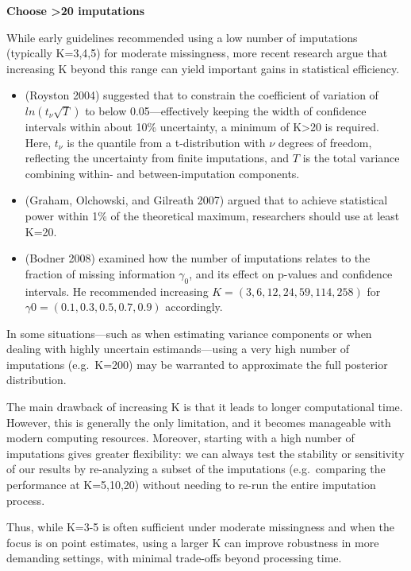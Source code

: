 \documentclass{article}
\providecommand{\tightlist}{%
  \setlength{\itemsep}{0pt}\setlength{\parskip}{0pt}}
\begin{document}
\textbf{Choose \textgreater20 imputations}

While early guidelines recommended using a low number of imputations
(typically K=3,4,5) for moderate missingness, more recent research argue
that increasing K beyond this range can yield important gains in
statistical efficiency.

\begin{itemize}
\tightlist
\item
  (Royston 2004) suggested that to constrain the coefficient of
  variation of \(ln(t_{\nu}\sqrt{T})\) to below 0.05---effectively
  keeping the width of confidence intervals within about 10\%
  uncertainty, a minimum of K\textgreater20 is required. Here,
  \(t_{\nu}\) is the quantile from a t-distribution with \({\nu}\)
  degrees of freedom, reflecting the uncertainty from finite
  imputations, and \(T\) is the total variance combining within- and
  between-imputation components.
\item
  (Graham, Olchowski, and Gilreath 2007) argued that to achieve
  statistical power within 1\% of the theoretical maximum, researchers
  should use at least K=20.
\item
  (Bodner 2008) examined how the number of imputations relates to the
  fraction of missing information \(\gamma_{0}\), and its effect on
  p-values and confidence intervals. He recommended increasing
  \(K=(3,6,12,24,59,114,258)\) for \(\gamma0=(0.1, 0.3, 0.5, 0.7, 0.9)\)
  accordingly.
\end{itemize}

In some situations---such as when estimating variance components or when
dealing with highly uncertain estimands---using a very high number of
imputations (e.g.~K=200) may be warranted to approximate the full
posterior distribution.

The main drawback of increasing K is that it leads to longer
computational time. However, this is generally the only limitation, and
it becomes manageable with modern computing resources. Moreover,
starting with a high number of imputations gives greater flexibility: we
can always test the stability or sensitivity of our results by
re-analyzing a subset of the imputations (e.g.~comparing the performance
at K=5,10,20) without needing to re-run the entire imputation process.

Thus, while K=3-5 is often sufficient under moderate missingness and
when the focus is on point estimates, using a larger K can improve
robustness in more demanding settings, with minimal trade-offs beyond
processing time.
\end{document}
